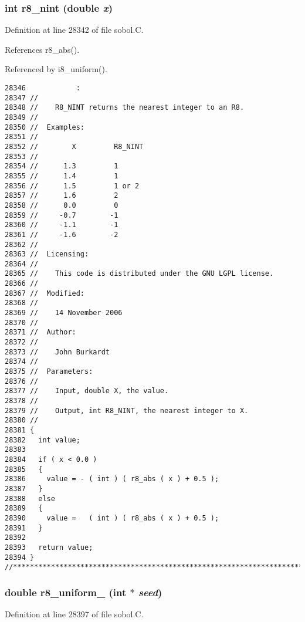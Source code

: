 \subsubsection{\setlength{\rightskip}{0pt plus 5cm}int r8\_\-nint (double {\em x})}\label{sobol_8C_7e0d15a4d0accb8c91928f44aa302394}




Definition at line 28342 of file sobol.C.

References r8\_\-abs().

Referenced by i8\_\-uniform().

\begin{Code}\begin{verbatim}28346            :
28347 //
28348 //    R8_NINT returns the nearest integer to an R8.
28349 //
28350 //  Examples:
28351 //
28352 //        X         R8_NINT
28353 //
28354 //      1.3         1
28355 //      1.4         1
28356 //      1.5         1 or 2
28357 //      1.6         2
28358 //      0.0         0
28359 //     -0.7        -1
28360 //     -1.1        -1
28361 //     -1.6        -2
28362 //
28363 //  Licensing:
28364 //
28365 //    This code is distributed under the GNU LGPL license. 
28366 //
28367 //  Modified:
28368 //
28369 //    14 November 2006
28370 //
28371 //  Author:
28372 //
28373 //    John Burkardt
28374 //
28375 //  Parameters:
28376 //
28377 //    Input, double X, the value.
28378 //
28379 //    Output, int R8_NINT, the nearest integer to X.
28380 //
28381 {
28382   int value;
28383 
28384   if ( x < 0.0 )
28385   {
28386     value = - ( int ) ( r8_abs ( x ) + 0.5 );
28387   }
28388   else
28389   {
28390     value =   ( int ) ( r8_abs ( x ) + 0.5 );
28391   }
28392 
28393   return value;
28394 }
//****************************************************************************80
\end{verbatim}
\end{Code}


\subsubsection{\setlength{\rightskip}{0pt plus 5cm}double r8\_\-uniform\_ (int $\ast$ {\em seed})}\label{sobol_8C_3d16b58f491227d91093012f40694e0f}




Definition at line 28397 of file sobol.C.

